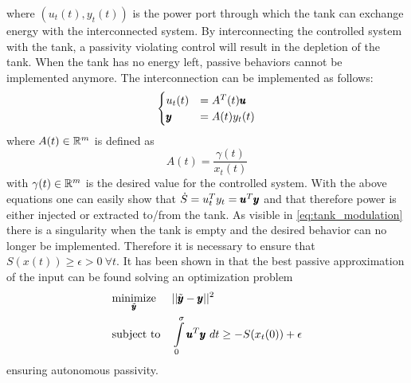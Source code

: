 where $(u_t(t), y_t(t))$ is the power port through which the tank can exchange energy with the interconnected system. By interconnecting the controlled system with the tank, a passivity violating control will result in the depletion of the tank. When the tank has no energy left, passive behaviors cannot be implemented anymore. The interconnection can be implemented as follows:
\begin{equation}
\begin{cases}
    u_t(t) &= A^T(t) \pmb{u} \\
    \pmb{y} &= A(t) y_t(t)
\end{cases}
\end{equation}
where $A(t) \in \mathbb{R}^{m}$ is defined as
\begin{equation} \label{eq:tank_modulation}
    A(t) = \frac{\gamma(t)}{x_t(t)}
\end{equation}
with $\gamma(t) \in \mathbb{R}^{m}$ is the desired value for the controlled system. With the above equations one can easily show that $\dot{S} = u_t^T y_t = \pmb{u}^T \pmb{y}$ and that therefore power is either injected or extracted to/from the tank. As visible in \eqn \ref{eq:tank_modulation} there is a singularity when the tank is empty and the desired behavior can no longer be implemented. Therefore it is necessary to ensure that $S(x(t)) \geq \epsilon > 0 \ \forall t$.  It has been shown in \cite{secchi2019energy} that the best passive approximation of the input can be found solving an optimization problem 
\begin{equation}
\begin{aligned}
    & \underset{\tilde{\pmb{y}}}{\text{minimize}} 
    & & ||\tilde{\pmb{y}} - \pmb{y}||^2 \\
    & \text{subject to} 
    & & \int\limits_{0}^{\sigma} \pmb{u}^T \pmb{y}\ dt \geq -S(x_t(0)) + \epsilon 
\end{aligned}
\end{equation}
ensuring autonomous passivity.  
